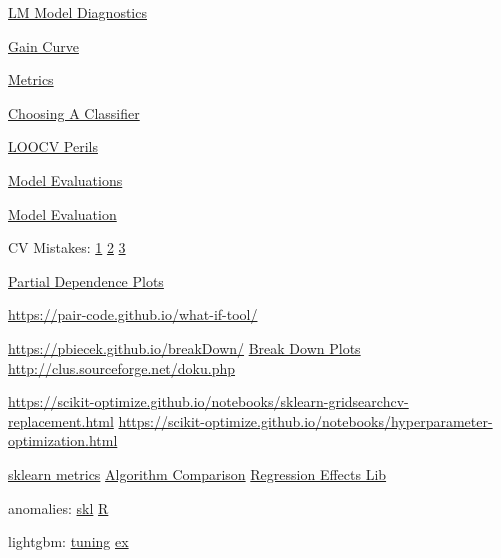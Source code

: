 \documentclass[]{book}
\begin{document}
\href{http://mpastell.com/2013/04/19/python_regression/}{LM Model Diagnostics}

\href{https://www.rdocumentation.org/packages/WVPlots/versions/0.2.6/topics/GainCurvePlot}{Gain Curve}

\href{https://www.analyticsvidhya.com/blog/2016/02/7-important-model-evaluation-error-metrics/}{Metrics}

\href{http://blog.echen.me/2011/04/27/choosing-a-machine-learning-classifier/}{Choosing A Classifier}

\href{http://www.russpoldrack.org/2012/12/the-perils-of-leave-one-out.html}{LOOCV Perils}

\href{http://www.win-vector.com/blog/2016/12/be-careful-evaluating-model-predictions/}{Model Evaluations}

\href{http://blog.dato.com/how-to-evaluate-machine-learning-models-part-1-orientation}{Model Evaluation}

CV Mistakes: \href{http://betatim.github.io/posts/cross-validation-gone-wrong/}{1} \href{http://www.alfredo.motta.name/cross-validation-done-wrong/}{2} \href{http://robjhyndman.com/hyndsight/crossvalidation/}{3}

\href{https://cran.r-project.org/web/packages/pdp/pdp.pdf}{Partial Dependence Plots}

\url{https://pair-code.github.io/what-if-tool/}

\url{https://pbiecek.github.io/breakDown/} \href{https://cran.r-project.org/web/packages/breakDown/index.html}{Break Down Plots} \url{http://clus.sourceforge.net/doku.php}

\url{https://scikit-optimize.github.io/notebooks/sklearn-gridsearchcv-replacement.html} \url{https://scikit-optimize.github.io/notebooks/hyperparameter-optimization.html}

\href{http://scikit-learn.org/stable/modules/model_evaluation.html\#function-for-prediction-error-metrics}{sklearn metrics} \href{https://docs.google.com/spreadsheets/d/16i47Wmjpj8k-mFRk-NnXXU5tmSQz8h37YxluDV8Zy9U/edit\#gid=0}{Algorithm Comparison} \href{https://www.rdocumentation.org/packages/yhat/versions/2.0-0}{Regression Effects Lib}

anomalies: \href{http://scikit-learn.org/stable/modules/outlier_detection.html}{skl} \href{https://business-science.github.io/anomalize/}{R}

lightgbm: \href{https://medium.com/@pushkarmandot/https-medium-com-pushkarmandot-what-is-lightgbm-how-to-implement-it-how-to-fine-tune-the-parameters-60347819b7fc}{tuning} \href{https://www.kaggle.com/ezietsman/simple-python-lightgbm-example}{ex}
\end{document}
